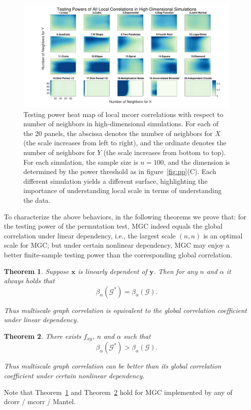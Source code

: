 \documentclass[11pt]{article}
\providecommand{\mb}[1]{\boldsymbol{#1}}
\newcommand{\G}{\mathcal{G}}
\newtheorem{thm}{Theorem}
\begin{document}
\begin{figure}[htbp]
\includegraphics[width=1.0\textwidth]{Figures/Fig6}
\caption{Testing power heat map of local mcorr correlations with respect to number of neighbors in high-dimensional simulations.
For each of the 20 panels, the abscissa denotes the number of neighbors for $X$ (the scale increases from left to right), and the ordinate denotes the number of neighbors for $Y$ (the scale increases from bottom to top). For each simulation, the sample size is $n=100$, and the dimension is determined by the power threshold as in figure~\ref{fig:pp}(C). Each different simulation yields a different surface, highlighting the importance of understanding local scale in terms of understanding the data. }
\label{figSim6}
\end{figure}

To characterize the above behaviors, in the following theorems we prove that: for the testing power of the permutation test, MGC indeed equals the global correlation under linear dependency, i.e., the largest scale $(n,n)$ is an optimal scale for MGC; but under certain nonlinear dependency, MGC may enjoy a better finite-sample testing power than the corresponding global correlation. 

\begin{thm}
\label{thm2}
Suppose $\mb{x}$ is linearly dependent of $\mb{y}$. Then for any $n$ and $\alpha$ it always holds that
\begin{equation}
\beta_{\alpha}(\G^{*}) = \beta_{\alpha}(\G).
\end{equation}

Thus multiscale graph correlation is equivalent to the global correlation coefficient under linear dependency.
\end{thm}

\begin{thm}
\label{thm3}
There exists $f_{xy}$, $n$ and $\alpha$ such that 
\begin{equation}
\beta_{\alpha}(\G^{*}) > \beta_{\alpha}(\G).
\end{equation}

Thus multiscale graph correlation can be better than its global correlation coefficient under certain nonlinear dependency.
\end{thm}
Note that Theorem~\ref{thm2} and Theorem~\ref{thm3} hold for MGC implemented by any of dcorr / mcorr / Mantel.
\end{document}
